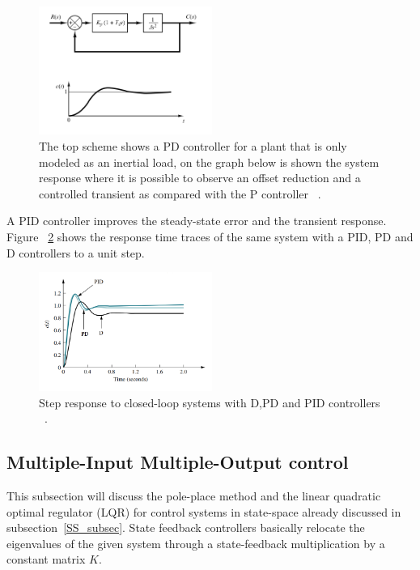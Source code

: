 \begin{figure}[h]
	\centering
	\includegraphics[width=0.505\textwidth]{Chp2/propderivgain.png}
	\caption{ The top scheme shows a PD controller for a  plant that is only modeled as an inertial load, on the graph below is shown the system response where it is possible to observe an offset reduction and a controlled transient as compared with the P controller ~\cite[Chapter~ 5]{Ogata2009}. \label{propderGain}}
\end{figure}

A PID controller improves the steady-state error and the transient response. Figure ~\ref{PID} shows the response time traces  of the same system with a PID, PD and D controllers to a unit step.
\smallskip



\begin{figure}[h]
	\centering
	\includegraphics[width=0.505\textwidth]{Chp2/PID_comp.png}
	\caption{ Step response to closed-loop systems with D,PD and PID controllers ~\cite[Chapter~ 9]{Nise}. \label{PID}}
\end{figure}

\subsection{Multiple-Input Multiple-Output control}

This subsection will discuss the pole-place method and the linear quadratic optimal regulator (LQR) for control systems in state-space already discussed in subsection~\ref{SS_subsec}.  State feedback controllers basically relocate the eigenvalues of the given system through a state-feedback multiplication by a constant matrix $K$.
 \smallskip
 
